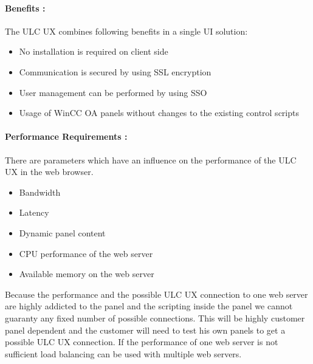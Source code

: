 \documentclass[a4paper, 12pt]{article}
\begin{document}
\paragraph{Benefits :}
The ULC UX combines following benefits in a single UI solution:
\begin{itemize}
    \item No installation is required on client side
    \item Communication is secured by using SSL encryption
    \item User management can be performed by using SSO
    \item Usage of WinCC OA panels without changes to the existing control scripts
\end{itemize}
\paragraph{Performance Requirements : }
There are parameters which have an influence on the performance of the ULC UX in the web browser.
\begin{itemize}
    \item Bandwidth
    \item Latency
    \item Dynamic panel content
    \item CPU performance of the web server
    \item Available memory on the web server
\end{itemize}
Because the performance and the possible ULC UX connection to one web server are highly addicted to the panel and the scripting inside the panel we cannot guaranty any fixed number of possible connections. 
This will be highly customer panel dependent and the customer will need to test his own panels to get a possible ULC UX connection. If the performance of one web server is not sufficient load balancing can be used with multiple web servers.
\end{document}
